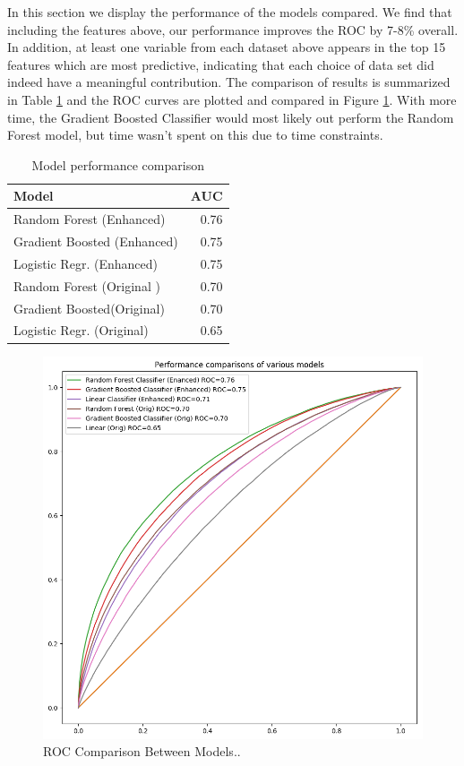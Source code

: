 \documentclass[twocolumn,showpacs,%
  nofootinbib,aps,superscriptaddress,%
  eqsecnum,prd,notitlepage,showkeys,10pt]{revtex4-1}
\begin{document}
In this section we display the performance of the models compared. We find that including the features above, our performance improves the ROC by 7-8\% overall. In addition, at least one variable from each dataset above appears in the top 15
features which are most predictive, indicating that each choice of data set did indeed have a meaningful contribution. The comparison of results is summarized in Table \ref{tab:widgets} and the ROC curves are plotted and compared in Figure \ref{fig:ROC}. With more time, the Gradient Boosted Classifier would most likely out perform the Random Forest model, but time wasn't spent on this due to time constraints. 

\begin{table}
\centering
\begin{tabular}{l|r}
Model & AUC\\\hline
Random Forest (Enhanced) & 0.76 \\
Gradient Boosted (Enhanced) & 0.75 \\
Logistic Regr. (Enhanced) & 0.75\\
Random Forest (Original )& 0.70 \\
Gradient Boosted(Original) & 0.70 \\
Logistic Regr. (Original) & 0.65
\end{tabular}
\caption{\label{tab:widgets}Model performance comparison}
\end{table}


\begin{figure}
\includegraphics[scale=0.35]{roc_final}
\caption{\label{fig:ROC}ROC Comparison Between Models..}
\end{figure}
\end{document}
